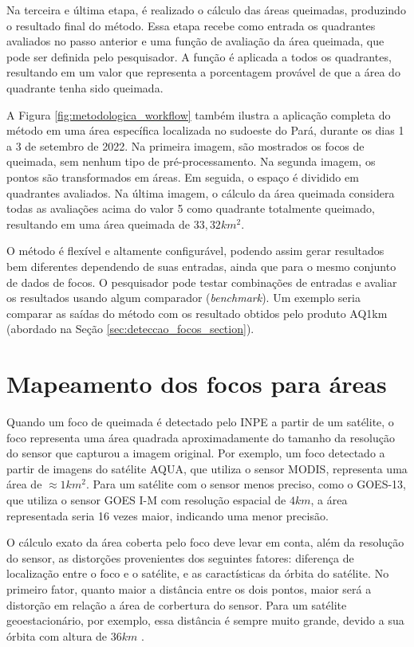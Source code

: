 \documentclass[cic,tc]{iiufrgs}
\begin{document}
Na terceira e última etapa, é realizado o cálculo das áreas queimadas, produzindo o resultado final do método. Essa etapa recebe como entrada os quadrantes avaliados no passo anterior e uma função de avaliação da área queimada, que pode ser definida pelo pesquisador. A função é aplicada a todos os quadrantes, resultando em um valor que representa a porcentagem provável de que a área do quadrante tenha sido queimada.

A Figura \ref{fig:metodologica_workflow} também ilustra a aplicação completa do método em uma área específica localizada no sudoeste do Pará, durante os dias 1 a 3 de setembro de 2022. Na primeira imagem, são mostrados os focos de queimada, sem nenhum tipo de pré-processamento. Na segunda imagem, os pontos são transformados em áreas. Em seguida, o espaço é dividido em quadrantes avaliados. Na última imagem, o cálculo da área queimada considera todas as avaliações acima do valor 5 como quadrante totalmente queimado, resultando em uma área queimada de $33,32 km^2$.

O método é flexível e altamente configurável, podendo assim gerar resultados bem diferentes dependendo de suas entradas, ainda que para o mesmo conjunto de dados de focos. O pesquisador pode testar combinações de entradas e avaliar os resultados usando algum comparador (\textit{benchmark}). Um exemplo seria comparar as saídas do método com os resultado obtidos pelo produto AQ1km (abordado na Seção \ref{sec:deteccao_focos_section}).

\section{Mapeamento dos focos para áreas}
\label{sec:focos_para_areas}

Quando um foco de queimada é detectado pelo INPE a partir de um satélite, o foco representa uma área quadrada aproximadamente do tamanho da resolução do sensor que capturou a imagem original. Por exemplo, um foco detectado a partir de imagens do satélite AQUA, que utiliza o sensor MODIS, representa uma área de $\approx1 km^2$. Para um satélite com o sensor menos preciso, como o GOES-13, que utiliza o sensor GOES I-M com resolução espacial de $4 km$, a área representada seria 16 vezes maior, indicando uma menor precisão.

O cálculo exato da área coberta pelo foco deve levar em conta, além da resolução do sensor, as distorções provenientes dos seguintes fatores: diferença de localização entre o foco e o satélite, e as caractísticas da órbita do satélite. No primeiro fator, quanto maior a distância entre os dois pontos, maior será a distorção em relação a área de corbertura do sensor. Para um satélite geoestacionário, por exemplo, essa distância é sempre muito grande, devido a sua órbita com altura de $36 km$ \citep{EmbrapaSatelites}.
\end{document}
